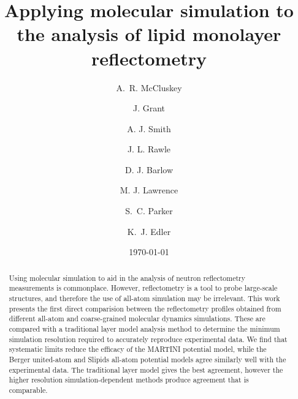 \documentclass[amsmath,amssymb,twocolumn,superscriptaddress]{revtex4-1}
\begin{document}

\title{Applying molecular simulation to the analysis of lipid monolayer
reflectometry}

\author{A.~R. McCluskey}

\author{J. Grant}

\author{A. J. Smith}

\author{J. L. Rawle}

\author{D. J. Barlow}

\author{M. J. Lawrence}

\author{S.~C. Parker}

\author{K.~J. Edler}

\date{\today}

\begin{abstract}
Using molecular simulation to aid in the analysis of neutron reflectometry
measurements is commonplace.
However, reflectometry is a tool to probe large-scale structures, and
therefore the use of all-atom simulation may be irrelevant.
This work presents the first direct comparision between the reflectometry
profiles obtained from different all-atom and coarse-grained molecular
dynamics simulations.
These are compared with a traditional layer model analysis method to
determine the minimum simulation resolution required to accurately reproduce
experimental data.
We find that systematic limits reduce the efficacy of the MARTINI potential
model, while the Berger united-atom and Slipids all-atom potential models
agree similarly well with the experimental data.
The traditional layer model gives the best agreement, however the higher
resolution simulation-dependent methods produce agreement that is comparable.
\end{abstract}
\end{document}
